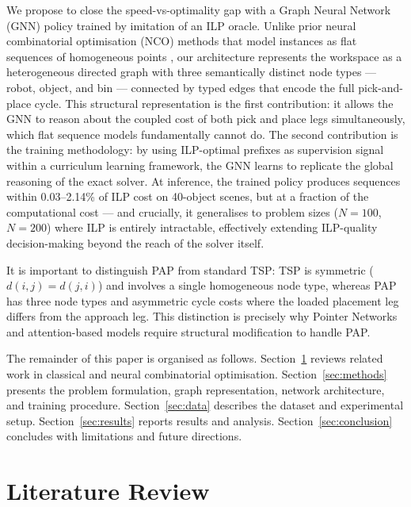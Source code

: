 \documentclass[conference]{IEEEtran}
\begin{document}
We propose to close the speed-vs-optimality gap with a Graph Neural Network (GNN) policy trained by imitation of an ILP oracle. Unlike prior neural combinatorial optimisation (NCO) methods that model instances as flat sequences of homogeneous points \cite{vinyals2015pointer, kool2019attention}, our architecture represents the workspace as a heterogeneous directed graph with three semantically distinct node types --- robot, object, and bin --- connected by typed edges that encode the full pick-and-place cycle. This structural representation is the first contribution: it allows the GNN to reason about the coupled cost of both pick and place legs simultaneously, which flat sequence models fundamentally cannot do. The second contribution is the training methodology: by using ILP-optimal prefixes as supervision signal within a curriculum learning framework, the GNN learns to replicate the global reasoning of the exact solver. At inference, the trained policy produces sequences within 0.03--2.14\% of ILP cost on 40-object scenes, but at a fraction of the computational cost --- and crucially, it generalises to problem sizes ($N{=}100$, $N{=}200$) where ILP is entirely intractable, effectively extending ILP-quality decision-making beyond the reach of the solver itself.

It is important to distinguish PAP from standard TSP: TSP is symmetric ($d(i,j)=d(j,i)$) and involves a single homogeneous node type, whereas PAP has three node types and asymmetric cycle costs where the loaded placement leg differs from the approach leg. This distinction is precisely why Pointer Networks \cite{vinyals2015pointer} and attention-based models \cite{kool2019attention} require structural modification to handle PAP.

The remainder of this paper is organised as follows. Section~\ref{sec:lit} reviews related work in classical and neural combinatorial optimisation. Section~\ref{sec:methods} presents the problem formulation, graph representation, network architecture, and training procedure. Section~\ref{sec:data} describes the dataset and experimental setup. Section~\ref{sec:results} reports results and analysis. Section~\ref{sec:conclusion} concludes with limitations and future directions.

\section{Literature Review}\label{sec:lit}
\end{document}
